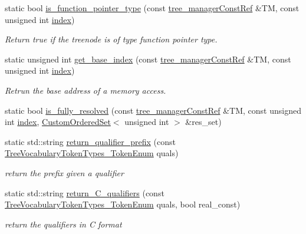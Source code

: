 \begin{DoxyCompactItemize}
static bool \hyperlink{classtree__helper_a05f90f478c4b88ce9445b6537e046a2d}{is\+\_\+function\+\_\+pointer\+\_\+type} (const \hyperlink{tree__manager_8hpp_a792e3f1f892d7d997a8d8a4a12e39346}{tree\+\_\+manager\+Const\+Ref} \&TM, const unsigned int \hyperlink{tutorial__pact__2019_2Introduction_2third_2include_2Keccak_8h_a028c9bdc8344cca38ab522a337074797}{index})
\begin{DoxyCompactList}\small\item\em Return true if the treenode is of type function pointer type. \end{DoxyCompactList}\item 
static unsigned int \hyperlink{classtree__helper_a1f4f49f85ee4642ce275b23f29b252eb}{get\+\_\+base\+\_\+index} (const \hyperlink{tree__manager_8hpp_a792e3f1f892d7d997a8d8a4a12e39346}{tree\+\_\+manager\+Const\+Ref} \&TM, const unsigned int \hyperlink{tutorial__pact__2019_2Introduction_2third_2include_2Keccak_8h_a028c9bdc8344cca38ab522a337074797}{index})
\begin{DoxyCompactList}\small\item\em Retrun the base address of a memory access. \end{DoxyCompactList}\item 
static bool \hyperlink{classtree__helper_ab5d77cdf1e25cde59094436d0980cc5a}{is\+\_\+fully\+\_\+resolved} (const \hyperlink{tree__manager_8hpp_a792e3f1f892d7d997a8d8a4a12e39346}{tree\+\_\+manager\+Const\+Ref} \&TM, const unsigned int \hyperlink{tutorial__pact__2019_2Introduction_2third_2include_2Keccak_8h_a028c9bdc8344cca38ab522a337074797}{index}, \hyperlink{classCustomOrderedSet}{Custom\+Ordered\+Set}$<$ unsigned int $>$ \&res\+\_\+set)
\item 
static std\+::string \hyperlink{classtree__helper_a48ef1be9a6f2556d79102ba30cac4190}{return\+\_\+qualifier\+\_\+prefix} (const \hyperlink{token__interface_8hpp_a14502d0757789149f644966ca931b126}{Tree\+Vocabulary\+Token\+Types\+\_\+\+Token\+Enum} quals)
\begin{DoxyCompactList}\small\item\em return the prefix given a qualifier \end{DoxyCompactList}\item 
static std\+::string \hyperlink{classtree__helper_a0835a1c7302f0915a8dae4b22549780d}{return\+\_\+\+C\+\_\+qualifiers} (const \hyperlink{token__interface_8hpp_a14502d0757789149f644966ca931b126}{Tree\+Vocabulary\+Token\+Types\+\_\+\+Token\+Enum} quals, bool real\+\_\+const)
\begin{DoxyCompactList}\small\item\em return the qualifiers in C format \end{DoxyCompactList}\item 

\end{DoxyCompactItemize}
